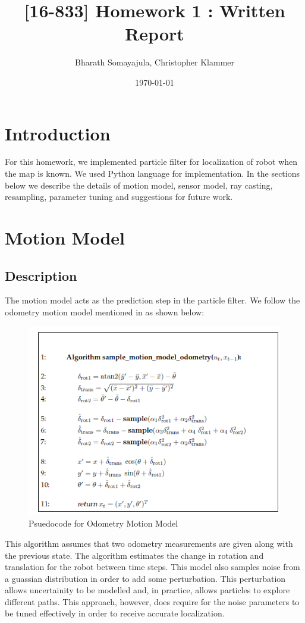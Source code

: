 \documentclass[12pt, a4paper]{article}
\title{[16-833] Homework 1 : Written Report}
\author{Bharath Somayajula, Christopher Klammer}
\date{\today}
\begin{document}
\maketitle

\tableofcontents

\clearpage

\section{Introduction}
For this homework, we implemented particle filter for localization of robot when the map is known. We used Python language for implementation. In the sections below we describe the details of motion model, sensor model, ray casting, resampling, parameter tuning and suggestions for future work.

\section{Motion Model}
\subsection{Description}
The motion model acts as the prediction step in the particle filter. We follow the odometry motion model mentioned in \cite{ProbRob} as shown below:


\begin{figure}[H]
  \center
  \includegraphics{OdometryMotionModel.png}
  \caption{Psuedocode for Odometry Motion Model \cite{ProbRob}}
\end{figure}

\noindent This algorithm assumes that two odometry measurements are given along with the previous state. The algorithm estimates the change in rotation and translation for the robot between time steps. This model also samples noise from a guassian distribution in order to add some perturbation. This perturbation allows uncertainity to be modelled and, in practice, allows particles to explore different paths. This approach, however, does require for the noise parameters to be tuned effectively in order to receive accurate localization.
\end{document}
